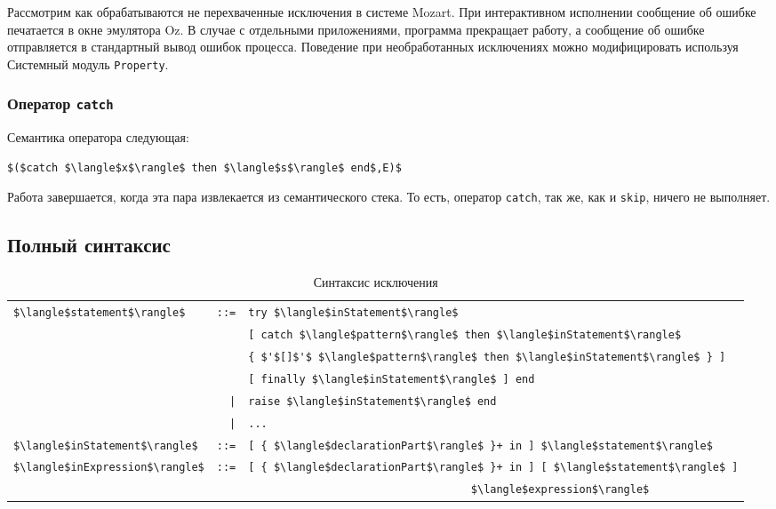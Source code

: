 Рассмотрим как обрабатываются не перехваченные исключения в системе Mozart. При интерактивном исполнении сообщение об ошибке печатается в окне эмулятора Oz. В случае с отдельными приложениями, программа прекращает работу, а сообщение об ошибке отправляется в стандартный вывод ошибок процесса. Поведение при необработанных исключениях можно модифицировать используя Системный модуль \lstinline|Property|.

\subsubsection{Оператор \lstinline|catch|}

Семантика оператора следующая:

\begin{lstlisting}
$($catch $\langle$x$\rangle$ then $\langle$s$\rangle$ end$,E)$
\end{lstlisting}

Работа завершается, когда эта пара извлекается из семантического стека. То есть, оператор \lstinline|catch|, так же, как и \lstinline|skip|, ничего не выполняет.

\subsection{Полный синтаксис}

\begin{table}
  \begin{tabular}{|lrl|}
    \hline
    \lstinline!$\langle$statement$\rangle$! & \lstinline!::=! & \lstinline!try $\langle$inStatement$\rangle$! \\
    & & \lstinline![ catch $\langle$pattern$\rangle$ then $\langle$inStatement$\rangle$! \\
      & & \lstinline!{ $'$[]$'$ $\langle$pattern$\rangle$ then $\langle$inStatement$\rangle$ } ]! \\
    & & \lstinline![ finally $\langle$inStatement$\rangle$ ] end! \\
    & \lstinline!|! & \lstinline!raise $\langle$inStatement$\rangle$ end! \\
    & \lstinline!|! & \lstinline!...! \\
    \lstinline!$\langle$inStatement$\rangle$! & \lstinline!::=! & \lstinline![ { $\langle$declarationPart$\rangle$ }+ in ] $\langle$statement$\rangle$! \\
    \lstinline!$\langle$inExpression$\rangle$! & \lstinline!::=! & \lstinline![ { $\langle$declarationPart$\rangle$ }+ in ] [ $\langle$statement$\rangle$ ]! \\
    & & \lstinline!                                   $\langle$expression$\rangle$!\\
    \hline
  \end{tabular}
\caption{Синтаксис исключения}
\label{table:exception_syntax}
\end{table}

